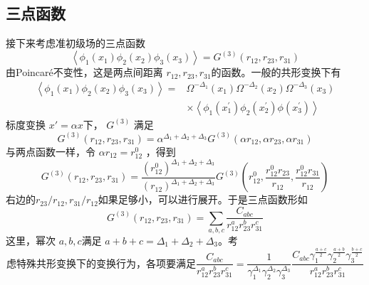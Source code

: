 \subsection{三点函数}
接下来考虑准初级场的三点函数
\begin{equation}
	\left\langle\phi_{1}\left(x_{1}\right) \phi_{2}\left(x_{2}\right) \phi_{3}\left(x_{3}\right)\right\rangle=G^{(3)}\left(r_{12}, r_{23}, r_{31}\right)
\end{equation}
由Poincaré不变性，这是两点间距离 $r_{12},r_{23},r_{31} $的函数。一般的共形变换下有
\begin{equation}
	\begin{aligned} \left\langle\phi_{1}\left(x_{1}\right) \phi_{2}\left(x_{2}\right) \phi_{3}\left(x_{3}\right)\right\rangle=& \Omega^{-\Delta_{1}}\left(x_{1}\right) \Omega^{-\Delta_{2}}\left(x_{2}\right) \Omega^{-\Delta_{3}}\left(x_{3}\right) \\ & \times\left\langle\phi_{1}\left(x_{1}^{\prime}\right) \phi_{2}\left(x_{2}^{\prime}\right) \phi\left(x_{3}^{\prime}\right)\right\rangle \end{aligned}
\end{equation}
标度变换 $x'=\alpha x $下， $G^{(3)}$ 满足
\begin{equation}
	G^{(3)}\left(r_{12}, r_{23}, r_{31}\right)=\alpha^{\Delta_{1}+\Delta_{2}+\Delta_{3}} G^{(3)}\left(\alpha r_{12}, \alpha r_{23}, \alpha r_{31}\right)
\end{equation}
与两点函数一样，令 $\alpha r_{12}=r^0_{12}$ ，得到
\begin{equation}
	G^{(3)}\left(r_{12}, r_{23}, r_{31}\right)=\frac{\left(r_{12}^{0}\right)^{\Delta_{1}+\Delta_{2}+\Delta_{3}}}{\left(r_{12}\right)^{\Delta_{1}+\Delta_{2}+\Delta_{3}}} G^{(3)}\left(r_{12}^{0}, \frac{r_{12}^{0} r_{23}}{r_{12}}, \frac{r_{12}^{0} r_{31}}{r_{12}}\right)
\end{equation}
右边的$ r_{23}/r_{12},r_{31}/r_{12} $如果足够小，可以进行展开。于是三点函数形如
\begin{equation}
	G^{(3)}\left(r_{12}, r_{23}, r_{31}\right)=\sum_{a, b, c} \frac{C_{a b c}}{r_{12}^{a} r_{23}^{b} r_{31}^{c}}
\end{equation}
这里，幂次 $a,b,c $满足 $a+b+c=\Delta_{1}+\Delta_{2}+\Delta_{3} $。考\begin{equation}
	虑特殊共形变换下的变换行为，各项要满足
\frac{C_{a b c}}{r_{12}^{a} r_{23}^{b} r_{31}^{c}}=\frac{1}{\gamma_{1}^{\Delta_{1}} \gamma_{2}^{\Delta_{2}} \gamma_{3}^{\Delta_{3}}} \frac{C_{a b c} \gamma_{1}^{\frac{a+c}{2}} \gamma_{2}^{\frac{a+b}{2}} \gamma_{3}^{\frac{b+c}{2}}}{r_{12}^{a} r_{23}^{b} r_{31}^{c}}
\end{equation}\
